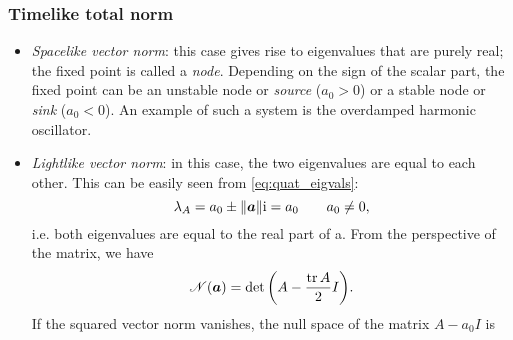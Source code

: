 \subsubsection*{Timelike total norm}
    \begin{itemize}
        \item[\circled{4}] \emph{Spacelike vector norm}: this case gives rise to eigenvalues that are purely real; the fixed point is called a \emph{node}. Depending on the sign of the scalar part, the fixed point can be an unstable node or \emph{source} (\(a_0 > 0\)) or a stable node or \emph{sink} (\(a_0 < 0\)). An example of such a system is the overdamped harmonic oscillator.
        \item[\circled{5}] \emph{Lightlike vector norm}: in this case, the two eigenvalues are equal to each other. This can be easily seen from \cref{eq:quat_eigvals}: 
            \begin{equation}
                \lambda_A = a_0 \pm \norm{\vec{a}}\ii = a_0\qquad a_0 \neq 0,
            \end{equation}
        i.e. both eigenvalues are equal to the real part of a. From the perspective of the matrix, we have
        \begin{equation}
            \mathscr{N}(\vec{a}) = \det\qty(A - \frac{\tr A}{2} I).
        \end{equation}
        If the squared vector norm vanishes, the null space of the matrix $A - a_0 I$ is


\end{itemize}
